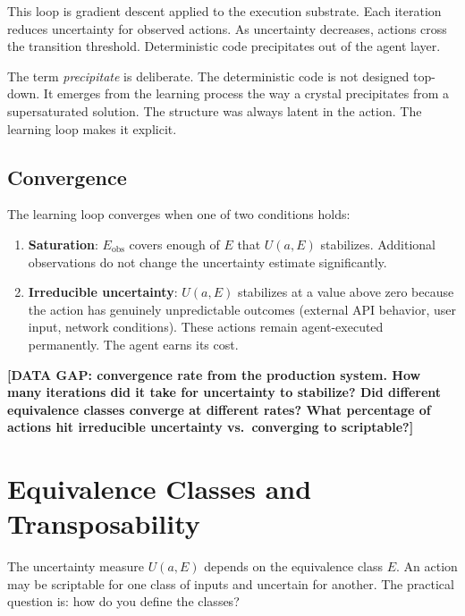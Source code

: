 \documentclass[11pt]{article}
\theoremstyle{definition}
\begin{document}
This loop is gradient descent applied to the execution substrate. Each
iteration reduces uncertainty for observed actions. As uncertainty
decreases, actions cross the transition threshold. Deterministic code
precipitates out of the agent layer.

The term \emph{precipitate} is deliberate. The deterministic code is
not designed top-down. It emerges from the learning process the way a
crystal precipitates from a supersaturated solution. The structure was
always latent in the action. The learning loop makes it explicit.

\subsection{Convergence}

The learning loop converges when one of two conditions holds:

\begin{enumerate}
\item \textbf{Saturation}: $E_{\text{obs}}$ covers enough of $E$ that
   $U(a, E)$ stabilizes. Additional observations do not change the
   uncertainty estimate significantly.

\item \textbf{Irreducible uncertainty}: $U(a, E)$ stabilizes at a value
   above zero because the action has genuinely unpredictable outcomes
   (external API behavior, user input, network conditions). These
   actions remain agent-executed permanently. The agent earns its cost.
\end{enumerate}

\textbf{[DATA GAP: convergence rate from the production system. How many
iterations did it take for uncertainty to stabilize? Did different
equivalence classes converge at different rates? What percentage of
actions hit irreducible uncertainty vs.\ converging to scriptable?]}

\section{Equivalence Classes and Transposability}
\label{sec:equivalence}

The uncertainty measure $U(a, E)$ depends on the equivalence class $E$.
An action may be scriptable for one class of inputs and uncertain for
another. The practical question is: how do you define the classes?
\end{document}
